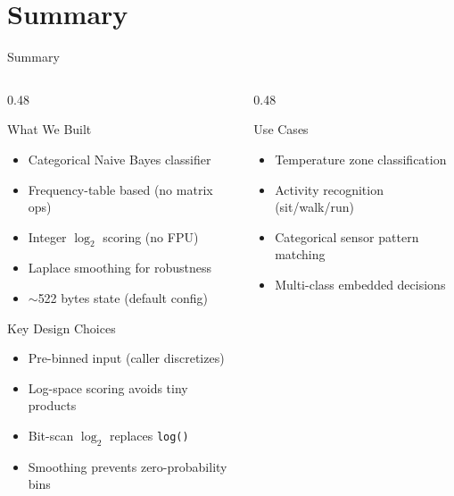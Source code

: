 \documentclass[aspectratio=169, 10pt]{beamer}
\begin{document}
\section{Summary}

\begin{frame}{Summary}
\begin{columns}[T]
\begin{column}{0.48\textwidth}
\begin{block}{What We Built}
\begin{itemize}
  \item Categorical Naive Bayes classifier
  \item Frequency-table based (no matrix ops)
  \item Integer $\log_2$ scoring (no FPU)
  \item Laplace smoothing for robustness
  \item $\sim$522 bytes state (default config)
\end{itemize}
\end{block}

\begin{block}{Key Design Choices}
\begin{itemize}
  \item Pre-binned input (caller discretizes)
  \item Log-space scoring avoids tiny products
  \item Bit-scan $\log_2$ replaces \texttt{log()}
  \item Smoothing prevents zero-probability bins
\end{itemize}
\end{block}
\end{column}

\begin{column}{0.48\textwidth}
\begin{block}{Use Cases}
\begin{itemize}
  \item Temperature zone classification
  \item Activity recognition (sit/walk/run)
  \item Categorical sensor pattern matching
  \item Multi-class embedded decisions
\end{itemize}
\end{block}


\end{column}
\end{columns}
\end{frame}
\end{document}
